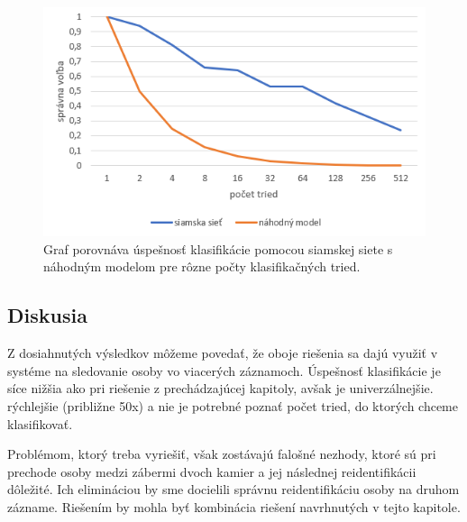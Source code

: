 \begin{figure}[H]
\centerline{\includegraphics[width=1\textwidth]{images/graph_oneshot_body.png}}
\caption[Výsledky klasifikácie podľa postáv]{Graf porovnáva úspešnosť klasifikácie pomocou siamskej siete s náhodným modelom pre rôzne počty klasifikačných tried.}
\label{obr:graph_oneshot_body}
\end{figure}

\subsection{Diskusia}
Z dosiahnutých výsledkov môžeme povedať, že oboje riešenia sa dajú využiť v systéme na sledovanie osoby vo viacerých záznamoch.
Úspešnosť klasifikácie je síce nižšia ako pri riešenie z prechádzajúcej kapitoly, avšak je univerzálnejšie. rýchlejšie (približne 50x) a nie je potrebné poznať počet tried, do ktorých chceme klasifikovať.

Problémom, ktorý treba vyriešiť, však zostávajú falošné nezhody, ktoré sú pri prechode osoby medzi zábermi dvoch kamier a jej následnej reidentifikácii dôležité.
Ich elimináciou by sme docielili správnu reidentifikáciu osoby na druhom zázname.
Riešením by mohla byť kombinácia riešení navrhnutých v tejto kapitole.
